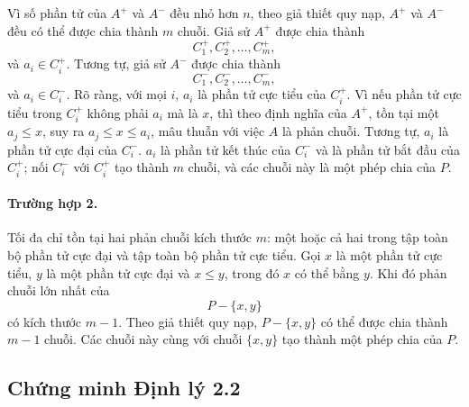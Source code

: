 \documentclass[11pt]{article}
\begin{document}
Vì số phần tử của \(A^+\) và \(A^-\) đều nhỏ hơn \(n\), theo giả thiết quy nạp,
\(A^+\) và \(A^-\) đều có thể được chia thành \(m\) chuỗi. Giả sử \(A^+\) được
chia thành
\[
  C_1^+,C_2^+,\ldots,C_m^+,
\]
và \(a_i\in C_i^+\). Tương tự, giả sử \(A^-\) được chia thành
\[
  C_1^-,C_2^-,\ldots,C_m^-,
\]
và \(a_i\in C_i^-\). Rõ ràng, với mọi \(i\), \(a_i\) là phần tử cực tiểu của
\(C_i^+\). Vì nếu phần tử cực tiểu trong \(C_i^+\) không phải \(a_i\) mà là
\(x\), thì theo định nghĩa của \(A^+\), tồn tại một \(a_j\le x\), suy ra
\(a_j\le x\le a_i\), mâu thuẫn với việc \(A\) là phản chuỗi. Tương tự, \(a_i\)
là phần tử cực đại của \(C_i^-\). \(a_i\) là phần tử kết thúc của \(C_i^-\) và
là phần tử bắt đầu của \(C_i^+\); nối \(C_i^-\) với \(C_i^+\) tạo thành \(m\)
chuỗi, và các chuỗi này là một phép chia của \(P\).

\paragraph{Trường hợp 2.}
Tối đa chỉ tồn tại hai phản chuỗi kích thước \(m\): một hoặc cả hai trong tập
toàn bộ phần tử cực đại và tập toàn bộ phần tử cực tiểu. Gọi \(x\) là một phần
tử cực tiểu, \(y\) là một phần tử cực đại và \(x\le y\), trong đó \(x\) có thể
bằng \(y\). Khi đó phản chuỗi lớn nhất của
\[
  P-\{x,y\}
\]
có kích thước \(m-1\). Theo giả thiết quy nạp, \(P-\{x,y\}\) có thể được chia
thành \(m-1\) chuỗi. Các chuỗi này cùng với chuỗi \(\{x,y\}\) tạo thành một
phép chia của \(P\).

\subsection{Chứng minh Định lý 2.2}
\end{document}
